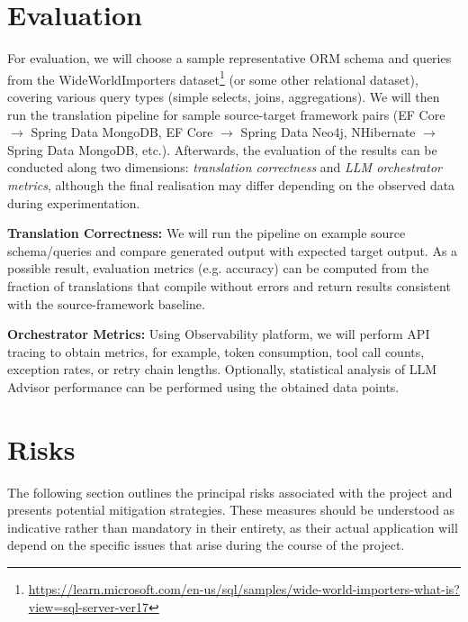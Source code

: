 \documentclass{article}
\begin{document}
\section{Evaluation}

For evaluation, we will choose a sample representative ORM schema and queries from the WideWorldImporters dataset\footnote{\url{https://learn.microsoft.com/en-us/sql/samples/wide-world-importers-what-is?view=sql-server-ver17}} (or some other relational dataset), covering various query types (simple selects, joins, aggregations). We will then run the translation pipeline for sample source-target framework pairs (EF Core $\to$ Spring Data MongoDB, EF Core $\to$ Spring Data Neo4j, NHibernate $\to$ Spring Data MongoDB, etc.). Afterwards, the evaluation of the results can be conducted along two dimensions: \emph{translation correctness} and \emph{LLM orchestrator metrics}, although the final realisation may differ depending on the observed data during experimentation. 

\textbf{Translation Correctness:} We will run the pipeline on example source schema/queries and compare generated output with expected target output. As a possible result, evaluation metrics (e.g. accuracy) can be computed from the fraction of translations that compile without errors and return results consistent with the source-framework baseline. 

\textbf{Orchestrator Metrics:} Using Observability platform, we will perform API tracing to obtain metrics, for example, token consumption, tool call counts, exception rates, or retry chain lengths. Optionally, statistical analysis of LLM Advisor performance can be performed using the obtained data points.

\section{Risks}

The following section outlines the principal risks associated with the project and presents potential mitigation strategies. These measures should be understood as indicative rather than mandatory in their entirety, as their actual application will depend on the specific issues that arise during the course of the project.
\end{document}
